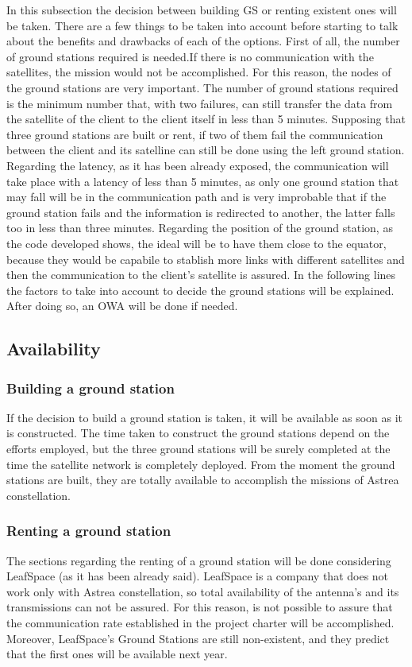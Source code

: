 In this subsection the decision between building GS or renting existent ones will be taken. There are a few things to be taken into account before starting to talk about the benefits and drawbacks of each of the options. First of all, the number of ground stations required is needed.If there is no communication with the satellites, the mission would not be accomplished. For this reason, the nodes of the ground stations are very important. The number of ground stations required is the minimum number that, with two failures, can still transfer the data from the satellite of the client to the client itself in less than 5 minutes. Supposing that three ground stations are built or rent, if two of them fail the communication between the client and its satelline can still be done using the left ground station. Regarding the latency, as it has been already exposed, the communication will take place with a latency of less than 5 minutes, as only one ground station that may fall will be in the communication path and is very improbable that if the ground station fails and the information is redirected to another, the latter falls too in less than three minutes. Regarding the position of the ground station, as the code developed shows, the ideal will be to have them close to the equator, because they would be capabile to stablish more links with different satellites and then the communication to the client's satellite is assured. In the following lines the factors to take into account to decide the ground stations will be explained. After doing so, an OWA will be done if needed.
\subsection{Availability}
\subsubsection{Building a ground station}
If the decision to build a ground station is taken, it will be available as soon as it is constructed. The time taken to construct the ground stations depend on the efforts employed, but the three ground stations will be surely completed at the time the satellite network is completely deployed. From the moment the ground stations are built, they are totally available to accomplish the missions of Astrea constellation.
\subsubsection{Renting a ground station}
The sections regarding the renting of a ground station will be done considering LeafSpace (as it has been already said). LeafSpace is a company that does not work only with Astrea constellation, so total availability of the antenna's and its transmissions can not be assured. For this reason, is not possible to assure that the communication rate established in the project charter will be accomplished. Moreover, LeafSpace's Ground Stations are still non-existent, and they predict that the first ones will be available next year.
